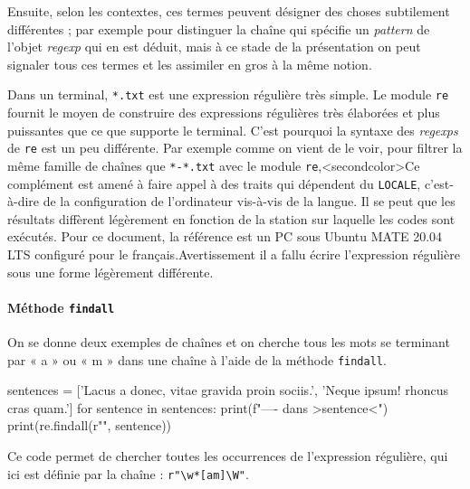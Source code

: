 Ensuite, selon les contextes, ces termes peuvent désigner des cho\-ses subtilement différentes ; par exemple pour distinguer la chaîne qui spécifie un \textit{pattern} de l'objet \textit{regexp} qui en est déduit, mais à ce stade de la présentation on peut signaler tous ces termes et les assimiler en gros à la même notion.


Dans un terminal, \texttt{*.txt} est une expression régulière très simple. Le module \texttt{re} fournit le moyen de construire des expressions régulières très élaborées et plus puissantes que ce que supporte le terminal. C'est pourquoi la syntaxe des \textit{regexps} de \texttt{re} est un peu différente. Par exemple comme on vient de le voir, pour filtrer la même famille de chaînes que \texttt{*-*.txt} avec le module \texttt{re},\caution[t]<secondcolor>{Ce complément est amené à faire appel à des traits qui dépendent du \texttt{LOCALE}, c'est-à-dire de la configuration de l'ordinateur vis-à-vis de la langue. Il se peut que les résultats diffèrent légèrement en fonction de la station sur laquelle les codes sont exécutés. Pour ce document, la référence est un PC sous Ubuntu MATE 20.04 LTS configuré pour le français.}{Avertissement}
 il a fallu écrire l'expression régulière sous une forme légèrement différente.

\paragraph{Méthode {\normalfont\texttt{findall}}}
On se donne deux exemples de chaînes et on cherche tous les mots se terminant par « a » ou « m » dans une chaîne à l'aide de la méthode \texttt{findall}.

\begin{idleconsole}
	\begin{pyconsole}
sentences = ['Lacus a donec, vitae gravida proin sociis.', 
             'Neque ipsum! rhoncus cras quam.']
for sentence in sentences:
	print(f"---- dans >{sentence}<")
	print(re.findall(r"\w*[am]\W", sentence))

	\end{pyconsole}
\end{idleconsole}

Ce code permet de chercher toutes les occurrences de l'expression régulière, qui ici est définie par la chaîne : \lstinline[basicstyle={\small\shellttfont}]{r"\w*[am]\W"}.


